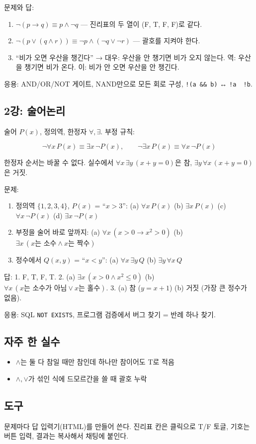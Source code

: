 문제와 답:

\begin{enumerate}
\def\labelenumi{\arabic{enumi}.}
\tightlist
\item
  \(\neg(p\to q)\equiv p\wedge\neg q\) --- 진리표의 두 열이 (F, T, F,
  F)로 같다.
\item
  \(\neg(p\vee(q\wedge r))\equiv\neg p\wedge(\neg q\vee\neg r)\) ---
  괄호를 지켜야 한다.
\item
  ``비가 오면 우산을 챙긴다'' → 대우: 우산을 안 챙기면 비가 오지 않는다.
  역: 우산을 챙기면 비가 온다. 이: 비가 안 오면 우산을 안 챙긴다.
\end{enumerate}

응용: AND/OR/NOT 게이트, NAND만으로 모든 회로 구성,
\texttt{!(a\ \&\&\ b)} ↔ \texttt{!a\ \textbar{}\textbar{}\ !b}.

\subsection{2강: 술어논리}

술어 \(P(x)\), 정의역, 한정자 \(\forall,\exists\). 부정 규칙:

\[
\neg\forall x\,P(x)\equiv\exists x\,\neg P(x),\qquad \neg\exists x\,P(x)\equiv\forall x\,\neg P(x)
\]

한정자 순서는 바꿀 수 없다. 실수에서 \(\forall x\,\exists y\,(x+y=0)\)은
참, \(\exists y\,\forall x\,(x+y=0)\)은 거짓.

문제:

\begin{enumerate}
\def\labelenumi{\arabic{enumi}.}
\tightlist
\item
  정의역 \(\{1,2,3,4\}\), \(P(x)\) = ``\(x>3\)'': (a)
  \(\forall x\,P(x)\) (b) \(\exists x\,P(x)\) (c)
  \(\forall x\,\neg P(x)\) (d) \(\exists x\,\neg P(x)\)
\item
  부정을 술어 바로 앞까지: (a) \(\forall x\,(x>0\to x^2>0)\) (b)
  \(\exists x\,(x\text{는 소수}\wedge x\text{는 짝수})\)
\item
  정수에서 \(Q(x,y)\) = ``\(x<y\)'': (a) \(\forall x\,\exists y\,Q\) (b)
  \(\exists y\,\forall x\,Q\)
\end{enumerate}

답: 1. F, T, F, T. 2. (a) \(\exists x\,(x>0\wedge x^2\le 0)\) (b)
\(\forall x\,(x\text{는 소수가 아님}\vee x\text{는 홀수})\). 3. (a) 참
(\(y=x+1\)) (b) 거짓 (가장 큰 정수가 없음).

응용: SQL \texttt{NOT\ EXISTS}, 프로그램 검증에서 버그 찾기 = 반례 하나
찾기.

\subsection{자주 한 실수}

\begin{itemize}
\tightlist
\item
  \(\wedge\)는 둘 다 참일 때만 참인데 하나만 참이어도 T로 적음
\item
  \(\wedge,\vee\)가 섞인 식에 드모르간을 쓸 때 괄호 누락
\end{itemize}

\subsection{도구}

문제마다 답 입력기(HTML)를 만들어 쓴다. 진리표 칸은 클릭으로 T/F 토글,
기호는 버튼 입력, 결과는 복사해서 채팅에 붙인다.
